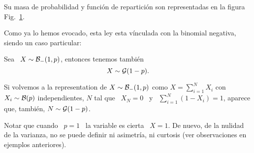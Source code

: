 Su masa  de probabilidad  y funci\'on de  repartici\'on son representadas  en la
figura Fig.~\ref{Fig:MP:Geometrica}.
%
\begin{figure}[h!]
\begin{center}  \end{center}
%
\label{Fig:MP:Geometrica}
\end{figure}


Como ya  lo hemos evocado, esta  ley esta v\'inculada con  la binomial negativa,
siendo un caso particular:
\begin{lema}\label{Lem:MP:VinculoGeomBinoNegativa}
%
  Sea \ $X \sim \mathcal{B}_-(1,p)$, entonces tenemos tambi\'en
  \[
  X \sim \mathcal{G}(1-p).
  \]
\end{lema}
%
Si volvemos  a la representation  de $X \sim  \mathcal{B}_-(1,p)$ como $X  = \sum_{i=1}^N
X_i$  con $X_i  \sim \mathcal{B}(p)$  independientes,  $N$ tal  que \  $X_N  = 0$  \ y  \
$\sum_{i=1}^N (1-X_i) = 1$, aparece que, tambi\'en, $N \sim \mathcal{G}(1-p)$.

Notar que cuando  \ $p = 1$ \ la variable  es cierta \ $X = 1$.  De nuevo, de la
nulidad de  la varianza, no  se puede definir  ni asimetr\'ia, ni  curtosis (ver
observaciones en ejemplos anteriores).
